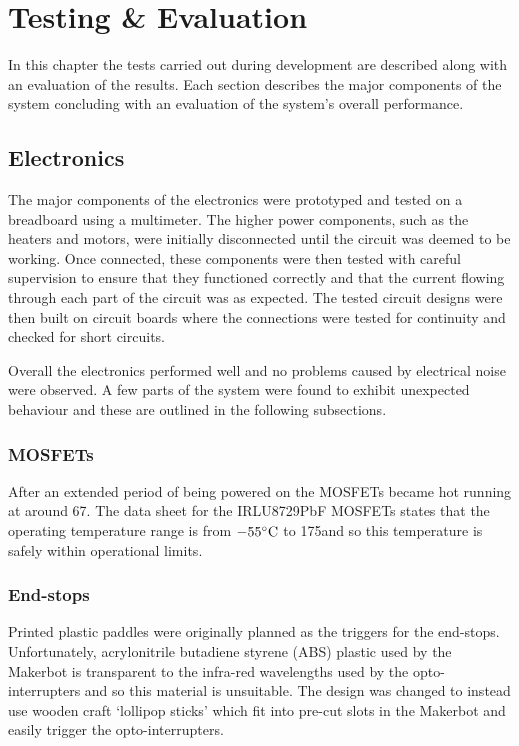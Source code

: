 \chapter{Testing \& Evaluation}
	
	\label{sec:testing}
	
	In this chapter the tests carried out during development are described along
	with an evaluation of the results. Each section describes the major components
	of the system concluding with an evaluation of the system's overall
	performance.
	
	\section{Electronics}
		
		The major components of the electronics were prototyped and tested on a
		breadboard using a multimeter. The higher power components, such as the
		heaters and motors, were initially disconnected until the circuit was deemed
		to be working. Once connected, these components were then tested with
		careful supervision to ensure that they functioned correctly and that the
		current flowing through each part of the circuit was as expected. The tested
		circuit designs were then built on circuit boards where the connections were
		tested for continuity and checked for short circuits.
		
		Overall the electronics performed well and no problems caused by electrical
		noise were observed. A few parts of the system were found to exhibit
		unexpected behaviour and these are outlined in the following subsections.
		
		\subsection{MOSFETs}
			
			After an extended period of being powered on the MOSFETs became hot
			running at around 67\dC. The data sheet for the IRLU8729PbF MOSFETs states
			that the operating temperature range is from $-55^\circ\textrm{C}{}$ to 175\dC and so
			this temperature is safely within operational limits.
			
		
		\subsection{End-stops}
			
			Printed plastic paddles were originally planned as the triggers for the
			end-stops. Unfortunately, acrylonitrile butadiene styrene (ABS) plastic
			used by the Makerbot is transparent to the infra-red wavelengths used by
			the opto-interrupters and so this material is unsuitable. The design was
			changed to instead use wooden craft `lollipop sticks' which fit into
			pre-cut slots in the Makerbot and easily trigger the opto-interrupters.
		
